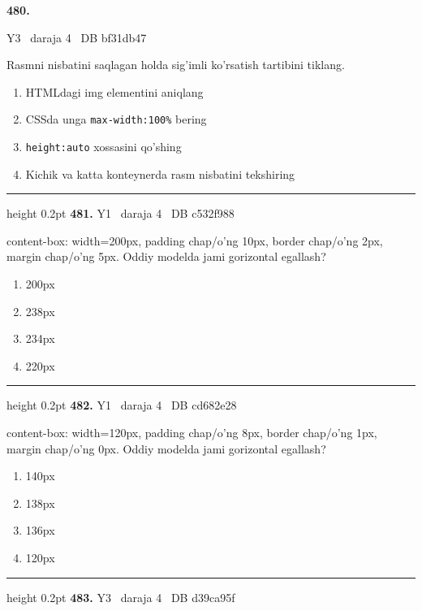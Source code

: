 \documentclass[10pt,a4paper,oneside]{article}
\begin{document}
\hypertarget{q480}{\textbf{\color{ink}480.}}  {\color{muted}\scriptsize Y3 \textbullet\ daraja 4 \textbullet\ DB bf31db47}
\par
Rasmni nisbatini saqlagan holda sig'imli ko'rsatish tartibini tiklang.
\begin{enumerate}[label=\Alph*),leftmargin=9mm]
\item HTMLdagi img elementini aniqlang
\item CSSda unga \texttt{max-width:100\%} bering
\item \texttt{height:auto} xossasini qo'shing
\item Kichik va katta konteynerda rasm nisbatini tekshiring
\end{enumerate}
\vspace{2mm}\hrule height 0.2pt \vspace{4mm}
\hypertarget{q481}{\textbf{\color{ink}481.}}  {\color{muted}\scriptsize Y1 \textbullet\ daraja 4 \textbullet\ DB c532f988}
\par
content-box: width=200px, padding chap/o'ng 10px, border chap/o'ng 2px, margin chap/o'ng 5px. Oddiy modelda jami gorizontal egallash?
\begin{enumerate}[label=\Alph*),leftmargin=9mm]
\item 200px
\item 238px
\item 234px
\item 220px
\end{enumerate}
\vspace{2mm}\hrule height 0.2pt \vspace{4mm}
\hypertarget{q482}{\textbf{\color{ink}482.}}  {\color{muted}\scriptsize Y1 \textbullet\ daraja 4 \textbullet\ DB cd682e28}
\par
content-box: width=120px, padding chap/o'ng 8px, border chap/o'ng 1px, margin chap/o'ng 0px. Oddiy modelda jami gorizontal egallash?
\begin{enumerate}[label=\Alph*),leftmargin=9mm]
\item 140px
\item 138px
\item 136px
\item 120px
\end{enumerate}
\vspace{2mm}\hrule height 0.2pt \vspace{4mm}
\hypertarget{q483}{\textbf{\color{ink}483.}}  {\color{muted}\scriptsize Y3 \textbullet\ daraja 4 \textbullet\ DB d39ca95f}
\end{document}
